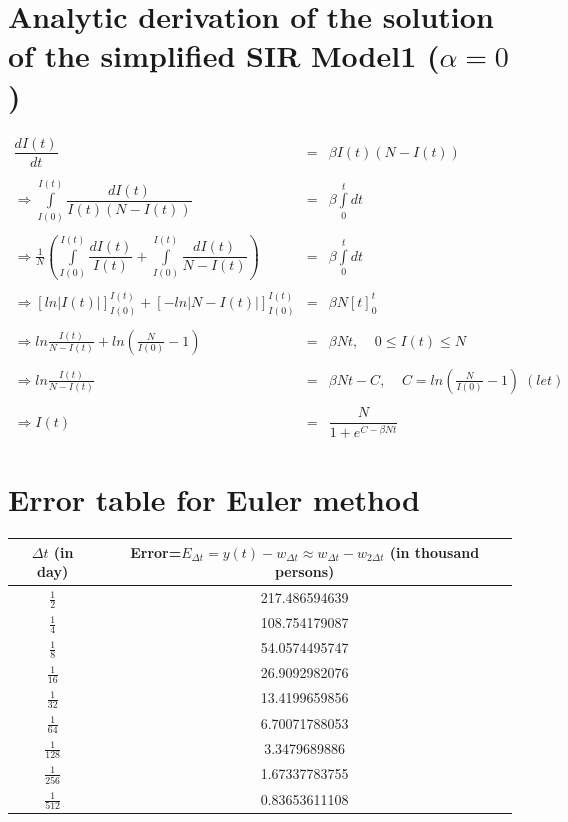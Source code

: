 \documentclass[11pt, a4paper, twoside]{report}
\begin{document}
\appendix     
\chapter{Analytic derivation of the solution of the simplified SIR Model1 ($\alpha=0$)} 

\begin{equation*}
\begin{array}{rcl} 
\dfrac{dI(t)}{dt} & = & \beta I(t)(N-I(t)) \\\\
\Rightarrow \int\limits_{I(0)}^{I(t)}\dfrac{dI(t)}{I(t)(N-I(t))} & = & \beta \int\limits_{0}^{t}dt \\\\
\Rightarrow \frac{1}{N}\left(\int\limits_{I(0)}^{I(t)}\dfrac{dI(t)}{I(t)} + \int\limits_{I(0)}^{I(t)}\dfrac{dI(t)}{N-I(t)}\right) & = & \beta \int\limits_{0}^{t}dt \\\\
\Rightarrow \left[ln|I(t)|\right]_{I(0)}^{I(t)} + \left[-ln|N-I(t)|\right]_{I(0)}^{I(t)} & = & \beta N [t]_{0}^{t} \\\\
\Rightarrow ln\frac{I(t)}{N-I(t)} + ln\left(\frac{N}{I(0)}-1\right) & = & \beta N t, \;\;\;\; 0 \leq I(t) \leq N\\\\
\Rightarrow ln\frac{I(t)}{N-I(t)} & = & \beta N t - C, \;\;\;\;  C = ln\left(\frac{N}{I(0)}-1\right)\; (let)\\\\
\Rightarrow I(t)  & = & \dfrac{N}{1+e^{C-\beta N t}}
\end{array}
\end{equation*}

\chapter{Error table for Euler method} 

\begin{table}[h!]
  \begin{tabular}{ | c | c | }
    \hline
    $\Delta t$ (in day) &  Error=$E_{\Delta t}=y(t)-w_{\Delta t} \approx w_{\Delta t}-w_{2\Delta t}$ (in thousand persons) \\ \hline
    $\frac{1}{2}$   &    217.486594639 \\ \hline
    $\frac{1}{4}$   &    108.754179087 \\ \hline
    $\frac{1}{8}$   &    54.0574495747 \\ \hline
    $\frac{1}{16}$   &    26.9092982076 \\ \hline
    $\frac{1}{32}$  &    13.4199659856 \\ \hline
    $\frac{1}{64}$  &    6.70071788053 \\ \hline
    $\frac{1}{128}$  &    3.3479689886 \\ \hline
    $\frac{1}{256}$ &    1.67337783755 \\ \hline
    $\frac{1}{512}$ &    0.83653611108 \\ \hline
    \hline
  \end{tabular}
\end{table}
\end{document}
